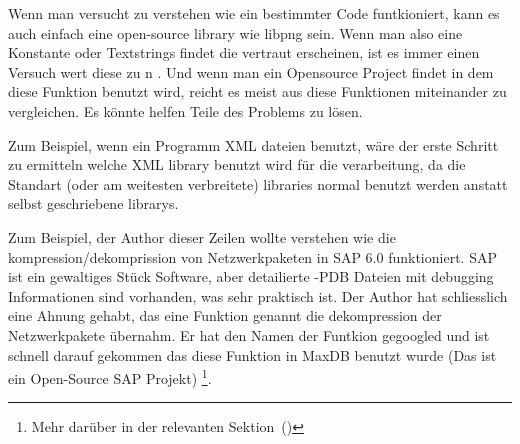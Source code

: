 
Wenn man versucht zu verstehen wie ein bestimmter Code funtkioniert, kann es auch einfach eine open-source library wie libpng sein. %
Wenn man also eine Konstante oder Textstrings findet die vertraut erscheinen, ist es immer einen Versuch wert diese zu n .
Und wenn man ein Opensource Project findet in dem diese Funktion benutzt wird, 
reicht es meist aus diese Funktionen miteinander zu vergleichen.
Es könnte helfen Teile des Problems zu lösen.


Zum Beispiel, wenn ein Programm XML dateien benutzt, wäre der erste Schritt zu ermitteln welche
XML library benutzt wird für die verarbeitung, da die Standart (oder am weitesten verbreitete) libraries
normal benutzt werden anstatt selbst geschriebene librarys.



Zum Beispiel, der Author dieser Zeilen wollte verstehen wie die kompression/dekomprission von Netzwerkpaketen in SAP 6.0 funktioniert.
SAP ist ein gewaltiges Stück Software, aber detailierte -\gls{PDB} Dateien mit debugging Informationen sind vorhanden, was sehr praktisch 
ist. Der Author hat schliesslich eine Ahnung gehabt, das eine Funktion genannt  die dekompression der Netzwerkpakete übernahm.
Er hat den Namen der Funtkion gegoogled und ist schnell darauf gekommen das diese Funktion in MaxDB benutzt wurde
(Das ist ein Open-Source SAP Projekt) \footnote{Mehr darüber in der relevanten Sektion~()}. 


